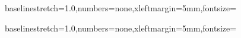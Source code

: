 










\newcommand{\somecode}[1]{\DefineShortVerb{\|}\SaveVerb{text}|#1|\UseVerb{text}\UndefineShortVerb{\|}}

%
{baselinestretch=1.0,numbers=none,xleftmargin=5mm,fontsize=\small}

%
{baselinestretch=1.0,numbers=none,xleftmargin=5mm,fontsize=\small}

\newcommand{\inputcppfile}[1]{%
  \VerbatimInput[baselinestretch=1.0,numbers=none,xleftmargin=5mm, fontseries=b, fontsize=\small]{#1}
}

\newcommand{\inputcppfilestrippedheader}[1]{%
  \VerbatimInput[baselinestretch=1.0,numbers=none,xleftmargin=5mm, fontseries=b, fontsize=\small,firstline=28]{#1}
}


%




